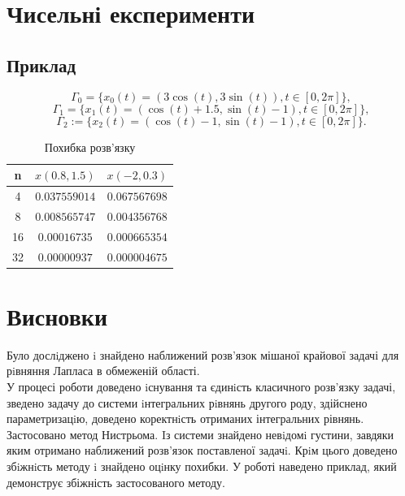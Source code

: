 \documentclass[a4 paper,12pt,ukrainian]{report}
\begin{document}
\chapter{Чисельні експерименти}
\section{Приклад}
\begin{equation*}
\Gamma_0 =\{x_0(t) = (3\cos(t),3\sin(t)), t \in [0,2\pi]\},
\end{equation*}
\begin{equation*}
\Gamma_1 =\{x_1(t) = (\cos(t)+1.5,\sin(t)-1), t \in [0,2\pi]\},
\end{equation*}
\begin{equation*}
\Gamma_2 :=\{x_2(t) = (\cos(t)-1,\sin(t)-1), t \in [0,2\pi]\}.
\end{equation*}
\begin{table}[h]
\caption{\label{tab:pr1}Похибка розв'язку}
\begin{center}
\begin{tabular}{|c|c|c|}
\hline
n & $x(0.8,1.5)$ & $x(-2,0.3)$\\
\hline
4 & $0.037559014$ & $0.067567698$\\
\hline
8 & $0.008565747$ & $0.004356768$\\
\hline
16 & $0.00016735$ & $0.000665354$\\
\hline
32 & $0.00000937$ & $0.000004675$\\
\hline
\end{tabular}
\end{center}
\end{table}
\chapter*{Висновки}
\hspace*{\parindent}Було дослiджено i знайдено наближений розв'язок мішаної крайової задачі для рiвняння Лапласа в обмеженій області.\\
\hspace*{\parindent}У процесі роботи доведено iснування та єдинiсть класичного розв’язку задачі, зведено задачу до системи iнтегральних рiвнянь другого роду, здійснено параметризацiю, доведено коректнiсть отриманих інтегральних рівнянь. Застосовано метод Нистрьома. Iз системи знайдено невiдомi густини, завдяки яким отримано наближений розв’язок поставленої задачi. Крiм цього доведено збiжнiсть методу i знайдено оцiнку похибки. У роботі наведено приклад, який демонструє збіжність застосованого методу.
\end{document}
